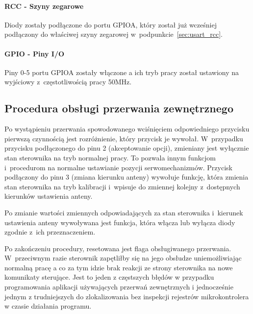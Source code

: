 \documentclass[eng,oneside]{mgr}
\begin{document}
				\paragraph{RCC - Szyny zegarowe}
				Diody zostały podłączone do portu GPIOA, który został już wcześniej podłączony do właściwej szyny zegarowej w~podpunkcie~\ref{sec:usart_rcc}.

				\paragraph{GPIO - Piny I/O}
				Piny 0-5 portu GPIOA zostały włączone a ich tryb pracy został ustawiony na wyjściowy z~częstotliwością pracy 50MHz.

			\subsection{Procedura obsługi przerwania zewnętrznego}
				Po wystąpieniu przerwania spowodowanego wciśnięciem odpowiedniego przycisku pierwszą czynnością jest rozróżnienie, który przycisk je wywołał. W~przypadku przycisku podłączonego do pinu 2 (akceptowanie opcji), zmieniany jest wyłącznie stan sterownika na tryb normalnej pracy. To pozwala innym funkcjom i~procedurom na normalne ustawianie pozycji serwomechanizmów. Przycisk podłączony do pinu 3 (zmiana kierunku anteny) wywołuje funkcję, która zmienia stan sterownika na tryb kalibracji i~wpisuje do zmiennej kolejny z~dostępnych kierunków ustawienia anteny.

				Po zmianie wartości zmiennych odpowiadających za stan sterownika i~kierunek ustawienia anteny wywoływana jest funkcja, która włącza lub wyłącza diody zgodnie z~ich przeznaczeniem.

				Po zakończeniu procedury, resetowana jest flaga obsługiwanego przerwania. W~przeciwnym razie sterownik zapętliłby się na jego obsłudze uniemożliwiając normalną pracę a co za tym idzie brak reakcji ze strony sterownika na nowe komunikaty sterujące. Jest to jeden z częstszych błędów w przypadku programowania aplikacji używających przerwań zewnętrznych i jednocześnie jednym z trudniejszych do zlokalizowania bez inspekcji rejestrów mikrokontrolera w czasie działania programu.
\end{document}
